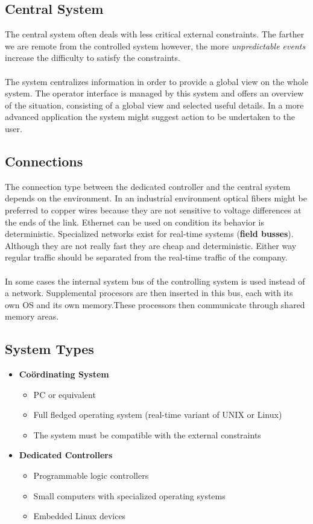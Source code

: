 \documentclass[../main.tex]{subfiles}
\begin{document}
\subsection{Central System}
The central system often deals with less critical external constraints. The farther we are remote from the controlled system however, the more \textit{unpredictable events} increase the difficulty to satisfy the constraints. 
\\\\
The system centralizes information in order to provide a global view on the whole system. The operator interface is managed by this system and offers an overview of the situation, consisting of a global view and selected useful details. In a more advanced application the system might suggest action to be undertaken to the user.

\subsection{Connections}
The connection type between the dedicated controller and the central system depends on the environment.
In an industrial environment optical fibers might be preferred to copper wires because they are not sensitive to voltage differences at the ends of the link.
Ethernet can be used on condition its behavior is deterministic.
Specialized networks exist for real-time systems (\textbf{field busses}).
Although they are not really fast they are cheap and deterministic. Either way regular traffic should be separated from the  real-time traffic of the company. 
\\\\
In some cases the internal system bus of the controlling system is used instead of a network. Supplemental procesors are then inserted in this bus, each with its own OS and its own memory.These processors then communicate through shared memory areas.

\subsection{System Types}
\begin{itemize}
	\item \textbf{Co\"ordinating System}
	\begin{itemize}
		\item PC or equivalent
		\item Full fledged operating system (real-time variant of UNIX or Linux)
		\item The system must be compatible with the external constraints
	\end{itemize}
	\item \textbf{Dedicated Controllers}
	\begin{itemize}
		\item Programmable logic controllers
		\item Small computers with specialized operating systems
		\item Embedded Linux devices
	\end{itemize}
\end{itemize}
\end{document}
